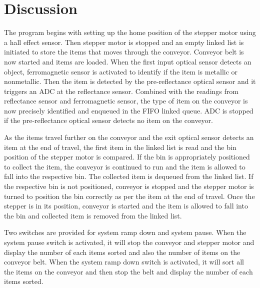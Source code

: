 \section{Discussion}\label{sec:discussion}
The program begins with setting up the home position of the stepper motor using a hall effect sensor. Then stepper motor is stopped and an empty linked list is initiated to store the items that moves through the conveyor. Conveyor belt is now started and items are loaded. When the first input optical sensor detects an object, ferromagnetic sensor is activated to identify if the item is metallic or nonmetallic. Then the item is detected by the pre-reflectance optical sensor and it triggers an ADC at the reflectance sensor. Combined with the readings from reflectance sensor and ferromagnetic sensor, the type of item on the conveyor is now precisely identified and enqueued in the FIFO linked queue. ADC is stopped if the pre-reflectance optical sensor detects no item on the conveyor. 

As the items travel further on the conveyor and the exit optical sensor detects an item at the end of travel, the first item in the linked list is read and the bin position of the stepper motor is compared. If the bin is appropriately positioned to collect the item, the conveyor is continued to run and the item is allowed to fall into the respective bin. The collected item is dequeued from the linked list. If the respective bin is not positioned, conveyor is stopped and the stepper motor is turned to position the bin correctly as per the item at the end of travel. Once the stepper is in its position, conveyor is started and the item is allowed to fall into the bin and collected item is removed from the linked list.

Two switches are provided for system ramp down and system pause. When the system pause switch is activated, it will stop the conveyor and stepper motor and display the number of each items sorted and also the number of items on the conveyor belt. When the system ramp down switch is activated, it will sort all the items on the conveyor and then stop the belt and display the number of each items sorted. 
